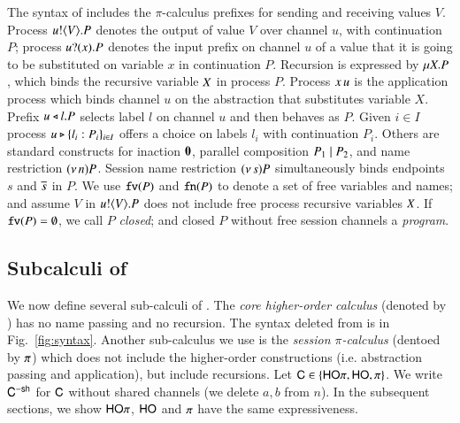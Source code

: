 The syntax of \HOp includes the
$\pi$-calculus prefixes for sending and receiving values $V$.
Process $u ! \langle V \rangle . P$ denotes the output of value $V$
over channel $u$, with continuation $P$;
process $u ? (x) . P$ denotes the input prefix on channel $u$ of a value
that it is going to be substituted on variable $x$ in continuation $P$. 
Recursion is expressed by $\mu X. P$,
which binds the recursive variable $X$ in process $P$.
Process $x\, {u}$ is the application
process which binds channel $u$ on the abstraction that
substitutes variable $X$.
Prefix $u \triangleleft l . P$ selects label $l$ on channel $u$ and then behaves as $P$.
Given $i \in I$ process $u \triangleright \{l_i: P_i\}_{i \in I}$ offers a choice on labels $l_i$ with
continuation $P_i$.
Others are standard constructs for 
inaction $\mathbf{0}$,  parallel composition $P_1 \;|\; P_2$, and 
name restriction $(\nu\, n) P$.
Session name restriction $(\nu\, s) P$ simultaneously binds endpoints $s$ and $\overline{s}$ in $P$.
We use $\mathtt{fv}(P)$ and $\mathtt{fn}(P)$ to denote a set of free variables and names; 
and assume $V$ in $u ! \langle V \rangle .{P}$ does not include free process recursive 
variables $X$. 
If $\mathtt{fv}(P) = \emptyset$, we call $P$ {\em closed}; and closed $P$ without 
free session channels a {\em program}. 

\subsection{Subcalculi of \HOp}
\label{subsec:subcalculi}
\noindent 
We now define several sub-calculi of \HOp. 
The {\em core higher-order calculus} (denoted by \HO) has 
no name passing and no recursion. The syntax deleted from \HOp
is  in Fig.~\ref{fig:syntax}. 
Another sub-calculus we use is the {\em session $\pi$-calculus} 
(dentoed by $\pi$) which does not include the higher-order constructions 
(i.e. abstraction passing and application), but include recursions. 
Let $\mathsf{C} \in \{\mathsf{HO}\pi, \mathsf{HO}, \pi\}$. We write 
$\mathsf{C}^{-\mathsf{sh}}$ for $\mathsf{C}$ without shared channels
 (we delete $a,b$ from $n$). In the subsequent sections, 
we show $\mathsf{HO}\pi$, $\mathsf{HO}$ and $\pi$ have the same expressiveness. 

